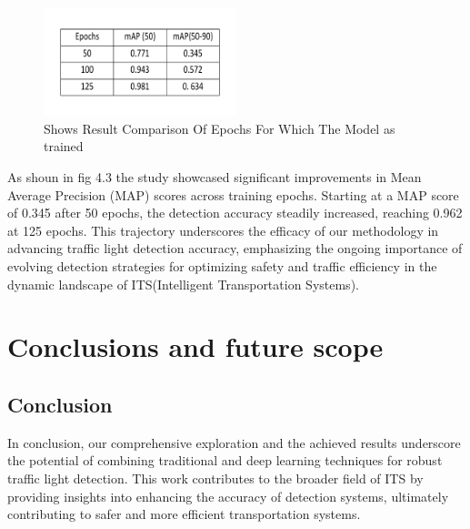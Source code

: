 \documentclass[12 pt]{report}
\begin{document}
{{    \begin{figure}[h]
      \centering
      \includegraphics[width=0.5\textwidth]{Comaprison Results.png}
      \caption{Shows Result Comparison Of Epochs For Which The Model as trained}
      \label{fig: YoloV8 implementation}
    \end{figure}

    \begin{justify}
    \hspace*{1cm} As shoun in fig 4.3 the study showcased significant improvements in Mean Average Precision (MAP) scores across training epochs. Starting at a MAP score of 0.345 after 50 epochs, the detection accuracy steadily increased, reaching 0.962 at 125 epochs. This trajectory underscores the efficacy of our methodology in advancing traffic light detection accuracy, emphasizing the ongoing importance of evolving detection strategies for optimizing safety and traffic efficiency in the dynamic landscape of ITS(Intelligent Transportation Systems).
    \end{justify}
  }
 }



\newpage
\chapter{Conclusions and future scope}
\section{Conclusion}
\justify
 {
  \hspace*{1cm} In conclusion, our comprehensive exploration and the achieved results underscore the potential of combining traditional and deep learning techniques for robust traffic light detection. This work contributes to the broader field of ITS by providing insights into enhancing the accuracy of detection systems, ultimately contributing to safer and more efficient transportation systems.
 }

\begin{flushleft}
\end{flushleft}
\end{document}

